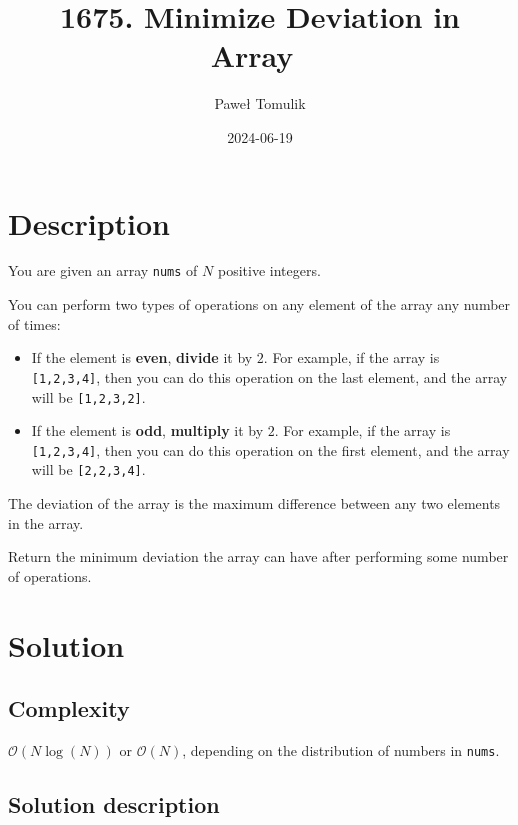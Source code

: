 \documentclass[paper=a4,parskip=half,DIV=12]{leetcode}
\begin{document}
\title{1675. Minimize Deviation in Array~\cite{leetcode:1675}}
\subtitle{}
\author{Paweł Tomulik}
\date{2024-06-19}
\maketitle

\section{Description}
\label{sec:description}

You are given an array \texttt{nums} of $N$ positive integers.

You can perform two types of operations on any element of the array any number
of times:

\begin{itemize}
  \item If the element is \textbf{even}, \textbf{divide} it by $2$. For example, if
    the array is \texttt{[1,2,3,4]}, then you can do this operation on the
    last element, and the array will be \texttt{[1,2,3,2]}.
  \item
    If the element is \textbf{odd}, \textbf{multiply} it by $2$. For example,
    if the array is \texttt{[1,2,3,4]}, then you can do this operation on the first
    element, and the array will be \texttt{[2,2,3,4]}.
\end{itemize}
The deviation of the array is the maximum difference between any two elements
in the array.

Return the minimum deviation the array can have after performing some number of
operations.

\section{Solution}
\label{sec:solution}

\subsection{Complexity}
\label{sec:complexity}

$\mathcal{O}(N \log{(N)})$ or $\mathcal{O}(N)$, depending on the distribution of numbers in \texttt{nums}.

\subsection{Solution description}
\label{sec:solution-description}
\end{document}
